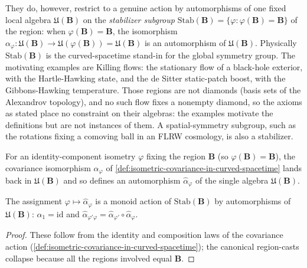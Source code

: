 They do, however, restrict to a genuine action by automorphisms of one fixed local algebra $\mathfrak{U}(\mathbf{B})$ on the \emph{stabilizer subgroup} $\mathrm{Stab}(\mathbf{B}) = \{\varphi : \varphi(\mathbf{B}) = \mathbf{B}\}$ of the region: when $\varphi(\mathbf{B}) = \mathbf{B}$, the isomorphism $\alpha_\varphi : \mathfrak{U}(\mathbf{B}) \to \mathfrak{U}(\varphi(\mathbf{B})) = \mathfrak{U}(\mathbf{B})$ is an automorphism of $\mathfrak{U}(\mathbf{B})$. Physically $\mathrm{Stab}(\mathbf{B})$ is the curved-spacetime stand-in for the global symmetry group. The motivating examples are Killing flows: the stationary flow of a black-hole exterior, with the Hartle-Hawking state, and the de Sitter static-patch boost, with the Gibbons-Hawking temperature. Those regions are not diamonds (basis sets of the Alexandrov topology), and no such flow fixes a nonempty diamond, so the axioms as stated place no constraint on their algebras: the examples motivate the definitions but are not instances of them. A spatial-symmetry subgroup, such as the rotations fixing a comoving ball in an FLRW cosmology, is also a stabilizer.

\begin{definition}
    \label{def:stabilizer-action-in-curved-spacetime}
    \leanok
    For an identity-component isometry $\varphi$ fixing the region $\mathbf{B}$ (so $\varphi(\mathbf{B}) = \mathbf{B}$), the covariance isomorphism $\alpha_\varphi$ of \ref{def:isometric-covariance-in-curved-spacetime} lands back in $\mathfrak{U}(\mathbf{B})$ and so defines an automorphism $\hat\alpha_\varphi$ of the single algebra $\mathfrak{U}(\mathbf{B})$.
\end{definition}

\begin{lemma}
    \label{lmm:stabilizer-action-laws-in-curved-spacetime}
    \leanok
    The assignment $\varphi \mapsto \hat\alpha_\varphi$ is a monoid action of $\mathrm{Stab}(\mathbf{B})$ by automorphisms of $\mathfrak{U}(\mathbf{B})$: $\hat\alpha_1 = \mathrm{id}$ and $\hat\alpha_{\varphi'\varphi} = \hat\alpha_{\varphi'}\circ\hat\alpha_\varphi$.
\end{lemma}
\begin{proof}
    \leanok
    These follow from the identity and composition laws of the covariance action (\ref{def:isometric-covariance-in-curved-spacetime}); the canonical region-casts collapse because all the regions involved equal $\mathbf{B}$.
\end{proof}

